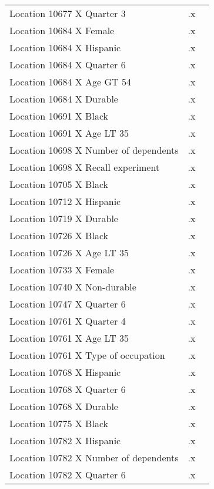 \begin{tabular}{l*{2}{c}}
Location 10677 X Quarter 3&          .x&            \\
Location 10684 X Female&          .x&            \\
Location 10684 X Hispanic&          .x&            \\
Location 10684 X Quarter 6&          .x&            \\
Location 10684 X Age GT 54&          .x&            \\
Location 10684 X Durable&          .x&            \\
Location 10691 X Black&          .x&            \\
Location 10691 X Age LT 35&          .x&            \\
Location 10698 X Number of dependents&          .x&            \\
Location 10698 X Recall experiment&          .x&            \\
Location 10705 X Black&          .x&            \\
Location 10712 X Hispanic&          .x&            \\
Location 10719 X Durable&          .x&            \\
Location 10726 X Black&          .x&            \\
Location 10726 X Age LT 35&          .x&            \\
Location 10733 X Female&          .x&            \\
Location 10740 X Non-durable&          .x&            \\
Location 10747 X Quarter 6&          .x&            \\
Location 10761 X Quarter 4&          .x&            \\
Location 10761 X Age LT 35&          .x&            \\
Location 10761 X Type of occupation&          .x&            \\
Location 10768 X Hispanic&          .x&            \\
Location 10768 X Quarter 6&          .x&            \\
Location 10768 X Durable&          .x&            \\
Location 10775 X Black&          .x&            \\
Location 10782 X Hispanic&          .x&            \\
Location 10782 X Number of dependents&          .x&            \\
Location 10782 X Quarter 6&          .x&            \\

\end{tabular}
